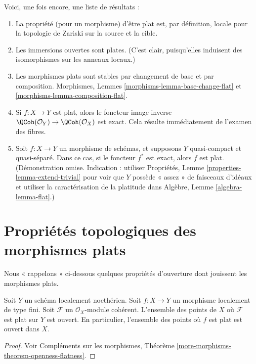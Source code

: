 \noindent
Voici, une fois encore, une liste de résultats :
\begin{enumerate}
\item La propriété (pour un morphisme) d'être plat est, par définition,
locale pour la topologie de Zariski sur la source et la cible.
\item Les immersions ouvertes sont plates. (C'est clair, puisqu'elles induisent des isomorphismes
sur les anneaux locaux.)
\item Les morphismes plats sont stables par changement de base et par composition.
Morphismes, Lemmes \ref{morphisms-lemma-base-change-flat} et
\ref{morphisms-lemma-composition-flat}.
\item Si $f : X \to Y$ est plat, alors le foncteur image inverse
$\QCoh(\mathcal{O}_Y) \to \QCoh(\mathcal{O}_X)$ est exact.
Cela résulte immédiatement de l'examen des fibres.
\item Soit $f : X \to Y$ un morphisme de schémas, et supposons $Y$
quasi-compact et quasi-séparé. Dans ce cas,
si le foncteur $f^*$ est exact, alors $f$ est plat.
(Démonstration omise. Indication : utiliser
Propriétés, Lemme \ref{properties-lemma-extend-trivial} pour voir que
$Y$ possède « assez » de faisceaux d'idéaux et utiliser la caractérisation de la
platitude dans Algèbre, Lemme \ref{algebra-lemma-flat}.)
\end{enumerate}



\section{Propriétés topologiques des morphismes plats}
\label{section-topological-flat}

\noindent
Nous « rappelons » ci-dessous quelques propriétés d'ouverture dont jouissent les morphismes plats.

\begin{theorem}
\label{theorem-flat-open}
Soit $Y$ un schéma localement noethérien.
Soit $f : X \to Y$ un morphisme localement de type fini.
Soit $\mathcal{F}$ un $\mathcal{O}_X$-module cohérent.
L'ensemble des points de $X$ où $\mathcal{F}$ est plat sur $Y$ est ouvert.
En particulier, l'ensemble des points où $f$ est plat est ouvert dans $X$.
\end{theorem}

\begin{proof}
Voir Compléments sur les morphismes, Théorème \ref{more-morphisms-theorem-openness-flatness}.
\end{proof}

